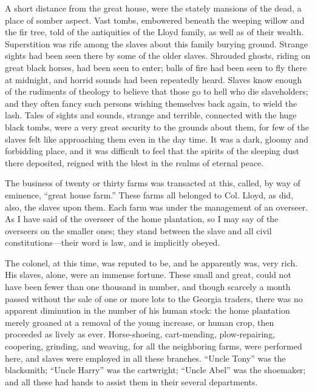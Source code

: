 A short distance from the great house, were the stately mansions of the
dead, a place of somber aspect. Vast tombs, embowered beneath the
weeping willow and the fir tree, told of the antiquities of the Lloyd
family, as well as of their wealth. Superstition was rife among the
slaves about this family burying ground. Strange sights had been seen
there by some of the older slaves. Shrouded ghosts, riding on great
black horses, had been seen to enter; balls of fire had been seen to fly
there at midnight, and horrid sounds had been repeatedly heard. Slaves
know enough of the rudiments of theology to believe that those go to
hell who die slaveholders; and they often fancy such persons wishing
themselves back again, to wield the lash. Tales of sights and sounds,
strange and terrible, connected with the huge black tombs, were a very
great security to the grounds about them, for few of the slaves felt
like approaching them even in the day time. It was a dark, gloomy and
forbidding place, and it was difficult to feel that the spirits of the
sleeping dust there deposited, reigned with the blest in the realms of
eternal peace.

The business of twenty or thirty farms was transacted at this, called,
by way of eminence, ``great house farm.'' These farms all belonged to
Col. Lloyd, as did, also, the slaves upon them. Each farm was under the
management of an overseer. As I have {}said of the overseer of the home
plantation, so I may say of the overseers on the smaller ones; they
stand between the slave and all civil constitutions---their word is law,
and is implicitly obeyed.

The colonel, at this time, was reputed to be, and he apparently was,
very rich. His slaves, alone, were an immense fortune. These small and
great, could not have been fewer than one thousand in number, and though
scarcely a month passed without the sale of one or more lots to the
Georgia traders, there was no apparent diminution in the number of his
human stock: the home plantation merely groaned at a removal of the
young increase, or human crop, then proceeded as lively as ever.
Horse-shoeing, cart-mending, plow-repairing, coopering, grinding, and
weaving, for all the neighboring farms, were performed here, and slaves
were employed in all these branches. ``Uncle Tony'' was the blacksmith;
``Uncle Harry'' was the cartwright; ``Uncle Abel'' was the shoemaker;
and all these had hands to assist them in their several departments.

